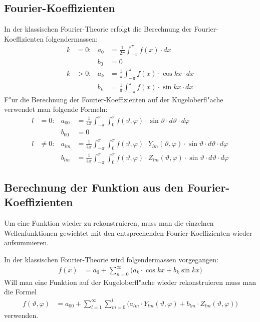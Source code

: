 \begin{refsection}
\subsection{Fourier-Koeffizienten}
In der klassischen Fourier-Theorie erfolgt die Berechnung der 
Fourier-Koeffizienten folgendermassen:
\begin{align*}
k&= 0: & a_{0} &= \frac{1}{2\pi} \int_{-\pi}^\pi f(x) \cdot dx
\\
&  & b_{0} &= 0
\\
k& > 0: & a_{k} &= \frac{1}{\pi} \int_{-\pi}^\pi f(x) \cdot \cos kx \cdot dx
\\
& & b_{k} &= \frac{1}{\pi} \int_{-\pi}^\pi f(x) \cdot \sin kx \cdot dx
\end{align*}
F"ur die Berechnung der Fourier-Koeffizienten auf der Kugeloberfl"ache 
verwendet man folgende Formeln:
%
\begin{align*}
l&=0: & a_{00} &= \frac{1}{4\pi} \int_{-\pi}^\pi \int_{0}^\pi f(\vartheta,\varphi) \cdot \sin\vartheta \cdot d\vartheta \cdot d\varphi
\\
&  & b_{00} &= 0
\\
l&\ne 0: & a_{lm} &= \frac{1}{4\pi} \int_{-\pi}^\pi \int_{0}^\pi f(\vartheta,\varphi) \cdot Y_{lm} (\vartheta, \varphi) \cdot \sin\vartheta \cdot d\vartheta \cdot d\varphi
\\
&  & b_{lm} &= \frac{1}{4\pi} \int_{-\pi}^\pi \int_{0}^\pi f(\vartheta,\varphi) \cdot Z_{lm} (\vartheta, \varphi) \cdot \sin\vartheta \cdot d\vartheta \cdot d\varphi
\end{align*}

\subsection{Berechnung der Funktion aus den Fourier-Koeffizienten}
Um eine Funktion wieder zu rekonstruieren, muss man die einzelnen 
Wellenfunktionen gewichtet mit den entsprechenden Fourier-Koeffizienten 
wieder aufsummieren.

In der klassischen Fourier-Theorie wird folgendermassen vorgegangen:
\begin{equation}
\begin{aligned}
f(x)&=a_0 + \sum_{n=0}^\infty \Big( a_k \cdot \cos kx + b_k \sin kx \Big)
\end{aligned}
\end{equation}
Will man eine Funktion auf der Kugeloberfl"ache wieder rekonstruieren 
muss man die Formel 
\begin{equation}
\begin{aligned}
f(\vartheta, \varphi) &= a_{00} + \sum_{l=1}^\infty \sum_{m=0}^l \Big( a_{lm} \cdot Y_{lm}(\vartheta, \varphi) + b_{lm} \cdot Z_{lm}(\vartheta, \varphi) \Big)
\end{aligned}
\end{equation}
verwenden.


\end{refsection}
